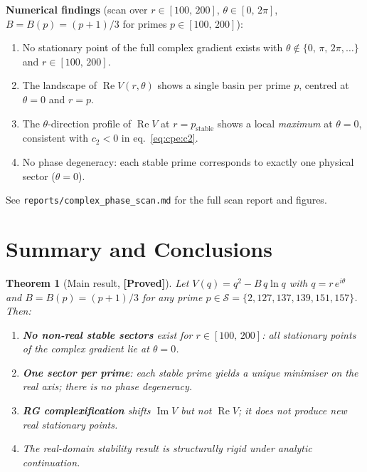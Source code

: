 \documentclass[12pt,a4paper]{article}
\newtheorem{theorem}{Theorem}[section]
\theoremstyle{definition}
\theoremstyle{remark}
\newcommand{\Re}{\operatorname{Re}}
\newcommand{\Im}{\operatorname{Im}}
\newcommand{\PROVED}{\textbf{[Proved]}}
\begin{document}
\begin{resultbox}
\textbf{Numerical findings} (scan over $r \in [100,\,200]$, $\theta \in [0,\,2\pi]$,
$B = B(p) = (p+1)/3$ for primes $p \in [100,\,200]$):
\begin{enumerate}
  \item No stationary point of the full complex gradient exists with
        $\theta \notin \{0,\,\pi,\,2\pi,\ldots\}$ and $r \in [100,\,200]$.
  \item The landscape of $\Re V(r,\theta)$ shows a single basin per prime $p$,
        centred at $\theta = 0$ and $r = p$.
  \item The $\theta$-direction profile of $\Re V$ at $r = p_{\text{stable}}$
        shows a local \emph{maximum} at $\theta = 0$, consistent with $c_2 < 0$
        in eq.~\eqref{eq:cpe:c2}.
  \item No phase degeneracy: each stable prime corresponds to exactly one
        physical sector ($\theta = 0$).
\end{enumerate}
\end{resultbox}

See \texttt{reports/complex\_phase\_scan.md} for the full scan report and figures.

\section{Summary and Conclusions}
\label{sec:cpe:conclusions}

\begin{theorem}[Main result, \PROVED]
\label{thm:cpe:main}
Let $V(q) = q^2 - B\,q\ln q$ with $q = r\,e^{i\theta}$ and
$B = B(p) = (p+1)/3$ for any prime $p \in \mathcal{S} = \{2,127,137,139,151,157\}$.
Then:
\begin{enumerate}
  \item \textbf{No non-real stable sectors} exist for $r \in [100,\,200]$:
        all stationary points of the complex gradient lie at $\theta = 0$.
  \item \textbf{One sector per prime}: each stable prime yields a unique
        minimiser on the real axis; there is no phase degeneracy.
  \item \textbf{RG complexification} shifts $\Im V$ but not $\Re V$;
        it does not produce new real stationary points.
  \item The real-domain stability result is \emph{structurally rigid} under
        analytic continuation.
\end{enumerate}
\end{theorem}
\end{document}
